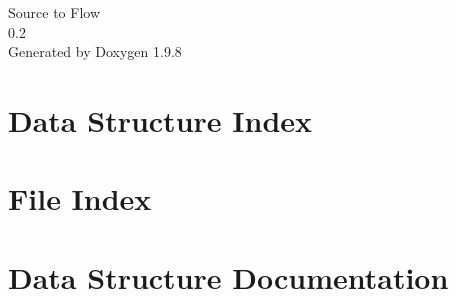 \documentclass[twoside]{book}
\newcommand{\+}{\discretionary{\mbox{\scriptsize$\hookleftarrow$}}{}{}}
\newcommand{\clearemptydoublepage}{%
    \newpage{\pagestyle{empty}\cleardoublepage}%
  }
\begin{document}
  \raggedbottom
    \hypersetup{pageanchor=false,
                bookmarksnumbered=true,
                pdfencoding=unicode
               }
  \begin{titlepage}
  \vspace*{7cm}
  \begin{center}%
  {\Large Source to Flow}\\
  [1ex]\large 0.\+2 \\
  \vspace*{1cm}
  {\large Generated by Doxygen 1.9.8}\\
  \end{center}
  \end{titlepage}
  \clearemptydoublepage
  \tableofcontents
  \clearemptydoublepage
  \hypersetup{pageanchor=true}




\chapter{Data Structure Index}

\chapter{File Index}

\chapter{Data Structure Documentation}




















\end{document}
